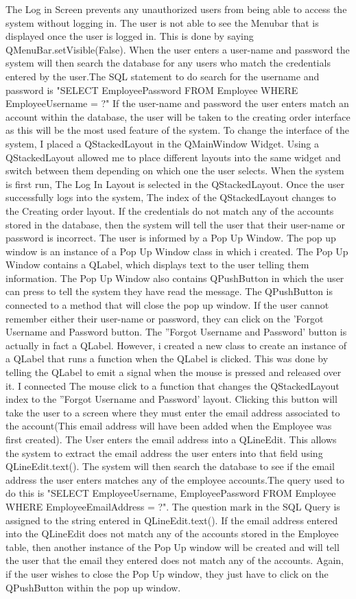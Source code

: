 The Log in Screen prevents any unauthorized users from being able to access the system without logging in. The user is not able to see the Menubar that is displayed once the user is logged in. This is done by saying QMenuBar.setVisible(False). When the user enters a user-name and password the system will then search the database for any users who match the credentials entered by the user.The SQL statement to do search for the username and password is "SELECT EmployeePassword FROM Employee WHERE EmployeeUsername = ?" If the user-name and password the user enters match an account within the database, the user will be taken to the creating order interface as this will be the most used feature of the system. To change the interface of the system, I placed a QStackedLayout in the QMainWindow Widget. Using a QStackedLayout allowed me to place different layouts into the same widget and switch between them depending on which one the user selects. When the system is first run, The Log In Layout is selected in the QStackedLayout. Once the user successfully logs into the system, The index of the QStackedLayout changes to the Creating order layout. If the credentials do not match any of the accounts stored in the database, then the system will tell the user that their user-name or password is incorrect. The user is informed by a Pop Up Window. The pop up window is an instance of a Pop Up Window class in which i created. The Pop Up Window contains a QLabel, which displays text to the user telling them information. The Pop Up Window also contains QPushButton in which the user can press to tell the system they have read the message. The QPushButton is connected to a method that will close the pop up window. If the user cannot remember either their user-name or password, they can click on the 'Forgot Username and Password button. The ''Forgot Username and Password' button is actually in fact a QLabel. However, i created a new class to create an instance of a QLabel that runs a function when the QLabel is clicked. This was done by telling the QLabel to emit a signal when the mouse is pressed and released over it. I connected The mouse click to a function that changes the QStackedLayout index to the ''Forgot Username and Password' layout. Clicking this button will take the user to a screen where they must enter the email address associated to the account(This email address will have been added when the Employee was first created). The User enters the email address into a QLineEdit. This allows the system to extract the email address the user enters into that field using QLineEdit.text(). The system will then search the database to see if the email address the user enters matches any of the employee accounts.The query used to do this is "SELECT EmployeeUsername, EmployeePassword FROM Employee WHERE EmployeeEmailAddress = ?". The question mark in the SQL Query is assigned to the string entered in QLineEdit.text(). If the email address entered into the QLineEdit does not match any of the accounts stored in the Employee table, then another instance of the Pop Up window will be created and will tell the user that the email they entered does not match any of the accounts. Again, if the user wishes to close the Pop Up window, they just have to click on the QPushButton within the pop up window. 
